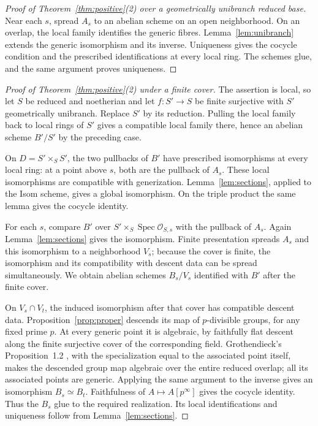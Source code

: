 \documentclass[11pt]{article}
\theoremstyle{definition}\newtheorem{definition}[theorem]{Definition}
\theoremstyle{remark}\newtheorem{remark}[theorem]{Remark}
\newcommand{\Spec}{\operatorname{Spec}}
\newcommand{\OO}{\mathcal O}
\begin{document}
\begin{proof}[Proof of Theorem~\ref{thm:positive}(2) over a geometrically unibranch reduced base]
Near each $s$, spread $A_s$ to an abelian scheme on an open neighborhood. On an overlap, the local family identifies the generic fibres. Lemma~\ref{lem:unibranch} extends the generic isomorphism and its inverse. Uniqueness gives the cocycle condition and the prescribed identifications at every local ring. The schemes glue, and the same argument proves uniqueness.
\end{proof}

\begin{proof}[Proof of Theorem~\ref{thm:positive}(2) under a finite cover]
The assertion is local, so let $S$ be reduced and noetherian and let $f:S'\to S$ be finite surjective with $S'$ geometrically unibranch. Replace $S'$ by its reduction. Pulling the local family back to local rings of $S'$ gives a compatible local family there, hence an abelian scheme $B'/S'$ by the preceding case.

On $D=S'\times_S S'$, the two pullbacks of $B'$ have prescribed isomorphisms at every local ring: at a point above $s$, both are the pullback of $A_s$. These local isomorphisms are compatible with generization. Lemma~\ref{lem:sections}, applied to the Isom scheme, gives a global isomorphism. On the triple product the same lemma gives the cocycle identity.

For each $s$, compare $B'$ over $S'\times_S\Spec\OO_{S,s}$ with the pullback of $A_s$. Again Lemma~\ref{lem:sections} gives the isomorphism. Finite presentation spreads $A_s$ and this isomorphism to a neighborhood $V_s$; because the cover is finite, the isomorphism and its compatibility with descent data can be spread simultaneously. We obtain abelian schemes $B_s/V_s$ identified with $B'$ after the finite cover.

On $V_s\cap V_t$, the induced isomorphism after that cover has compatible descent data. Proposition~\ref{prop:proper} descends its map of $p$-divisible groups, for any fixed prime $p$. At every generic point it is algebraic, by faithfully flat descent along the finite surjective cover of the corresponding field. Grothendieck's Proposition~1.2 \citep[p.~64]{GrothHom}, with the specialization equal to the associated point itself, makes the descended group map algebraic over the entire reduced overlap; all its associated points are generic. Applying the same argument to the inverse gives an isomorphism $B_s\simeq B_t$. Faithfulness of $A\mapsto A[p^\infty]$ gives the cocycle identity. Thus the $B_s$ glue to the required realization. Its local identifications and uniqueness follow from Lemma~\ref{lem:sections}.
\end{proof}
\end{document}
